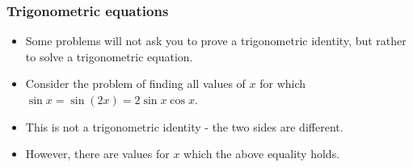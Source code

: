 \begin{frame}
\frametitle{Trigonometric equations}
\begin{itemize}
\item Some problems will not ask you to prove a trigonometric identity, but rather to solve a trigonometric equation. 
\item Consider the problem  of finding all values of $x$ for which $\sin x = \sin (2x) =2\sin x\cos x$. 
\item This is not a trigonometric identity - the two sides are different. 
\item However, there are values for $x$ which the above equality holds. 
\end{itemize}
\end{frame}
